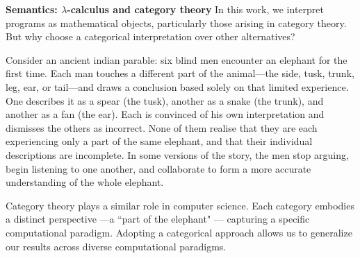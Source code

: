  



\noindent \textbf{Semantics: $\lambda$-calculus and category theory} In this work, we interpret programs as mathematical objects, particularly those arising in category theory. But why choose a categorical interpretation over other alternatives?

Consider an ancient indian parable: six blind men encounter an elephant for the first time. Each man touches a different part of the animal—the side, tusk, trunk, leg, ear, or tail—and draws a conclusion based solely on that limited experience. One describes it as a spear (the tusk), another as a snake (the trunk), and another as a fan (the ear). Each is convinced of his own interpretation and dismisses the others as incorrect. None of them realise that they are each experiencing only a part of the same elephant, and that their individual descriptions are incomplete. In some versions of the story, the men stop arguing, begin listening to one another, and collaborate to form a more accurate understanding of the whole elephant. 

Category theory plays a similar role in computer science. Each category embodies a distinct perspective ---a ``part of the elephant" --- capturing a specific computational paradigm. Adopting a categorical approach allows us to generalize our results across diverse computational paradigms.


